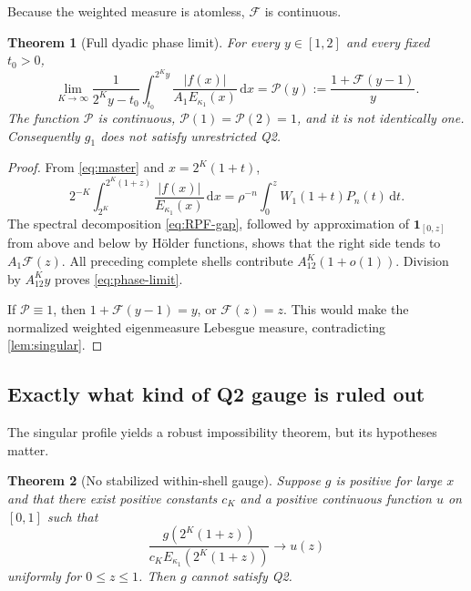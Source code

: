 \documentclass[11pt,oneside]{article}
\newtheorem{theorem}{Theorem}[section]
\theoremstyle{definition}
\theoremstyle{remark}
\newcommand{\dd}{\,\mathrm d}
\begin{document}
Because the weighted measure is atomless, $\mathscr F$ is continuous.

\begin{theorem}[Full dyadic phase limit]
\label{thm:phase}
For every $y\in[1,2]$ and every fixed $t_0>0$,
\begin{equation}
 \lim_{K\to\infty}
 \frac1{2^Ky-t_0}\int_{t_0}^{2^Ky}
 \frac{|f(x)|}{A_1E_{\kappa_1}(x)}\dd x
 =\mathscr P(y):=\frac{1+\mathscr F(y-1)}{y}.
 \label{eq:phase-limit}
\end{equation}
The function $\mathscr P$ is continuous,
$\mathscr P(1)=\mathscr P(2)=1$, and it is not identically one.
Consequently $g_1$ does not satisfy unrestricted Q2.
\end{theorem}

\begin{proof}
From \eqref{eq:master} and $x=2^K(1+t)$,
\begin{equation}
 2^{-K}\int_{2^K}^{2^K(1+z)}
 \frac{|f(x)|}{E_{\kappa_1}(x)}\dd x
 =\rho^{-n}\int_0^zW_1(1+t)P_n(t)\dd t.
 \label{eq:partial-shell}
\end{equation}
The spectral decomposition \eqref{eq:RPF-gap}, followed by approximation of
$\mathbf1_{[0,z]}$ from above and below by H\"older functions, shows that the
right side tends to $A_1\mathscr F(z)$.  All preceding complete shells
contribute $A_12^K(1+o(1))$.  Division by $A_12^Ky$ proves
\eqref{eq:phase-limit}.

If $\mathscr P\equiv1$, then
$1+\mathscr F(y-1)=y$, or $\mathscr F(z)=z$.  This would make the normalized
weighted eigenmeasure Lebesgue measure, contradicting \cref{lem:singular}.
\end{proof}

\subsection{Exactly what kind of Q2 gauge is ruled out}

The singular profile yields a robust impossibility theorem, but its hypotheses
matter.

\begin{theorem}[No stabilized within-shell gauge]
\label{thm:no-stabilized-gauge}
Suppose $g$ is positive for large $x$ and that there exist positive constants
$c_K$ and a positive continuous function $u$ on $[0,1]$ such that
\begin{equation}
 \frac{g(2^K(1+z))}
      {c_KE_{\kappa_1}(2^K(1+z))}
 \longrightarrow u(z)
 \label{eq:stabilized-gauge}
\end{equation}
uniformly for $0\le z\le1$.  Then $g$ cannot satisfy Q2.
\end{theorem}
\end{document}

